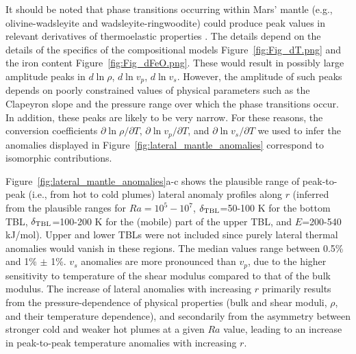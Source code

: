 It should be noted that phase transitions occurring within Mars' mantle (e.g., olivine-wadsleyite and wadsleyite-ringwoodite) could produce peak values in relevant derivatives of thermoelastic properties \citep{Stixrude2007}. The details  depend on the details of the specifics of the compositional models Figure~\ref{fig:Fig_dT.png} and the iron content Figure~\ref{fig:Fig_dFeO.png}. These would result in possibly large amplitude peaks in $d\ln \rho$, $d\ln v_p$, $d\ln v_s$. However, the amplitude of such peaks depends on poorly constrained values of physical parameters such as the Clapeyron slope and the pressure range over which the phase transitions occur. In addition, these peaks are likely to be very narrow. For these reasons, the conversion coefficients $\partial \ln\rho/\partial T$, $\partial \ln v_p/\partial T$, and $\partial \ln v_s/\partial T$ we used to infer the anomalies displayed in Figure~\ref{fig:lateral_mantle_anomalies} correspond to isomorphic contributions. 



Figure~\ref{fig:lateral_mantle_anomalies}a-c shows the plausible range of peak-to-peak (i.e., from hot to cold plumes) lateral anomaly profiles along $r$ (inferred from the plausible ranges for $Ra=10^5-10^7$, $\delta_{\rm TBL}$=50-100 K for the bottom TBL, $\delta_{\rm TBL}$=100-200 K for the (mobile) part of the upper TBL, and $E$=200-540 kJ/mol). Upper and lower TBLs were not included since purely lateral thermal anomalies would vanish in these regions. The median values range between 0.5\% and 1\% $\pm$ 1\%. $v_s$ anomalies are more pronounced than $v_p$, due to the higher sensitivity to temperature of the shear modulus compared to that of the bulk modulus. The increase of lateral anomalies with increasing $r$ primarily results from the pressure-dependence of physical properties (bulk and shear moduli, $\rho$, and their temperature dependence), and secondarily from the asymmetry between stronger cold and weaker hot plumes at a given $Ra$ value, leading to an increase in peak-to-peak temperature anomalies with increasing $r$. 

